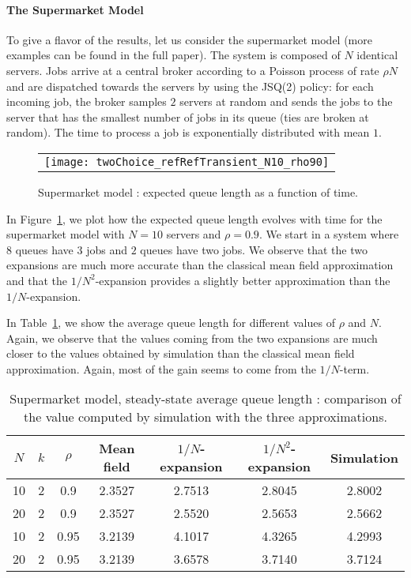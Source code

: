 \documentclass{sig-alternate-per-Performance2018}
\begin{document}
\paragraph*{The Supermarket Model}
To give a flavor of the results, let us consider the supermarket model
(more examples can be found in the full paper).  The system is
composed of $N$ identical servers. Jobs arrive at a central broker
according to a Poisson process of rate $\rho N$ and are dispatched
towards the servers by using the JSQ(2) policy: for each incoming job,
the broker samples $2$ servers at random and sends the jobs to the
server that has the smallest number of jobs in its queue (ties are
broken at random). The time to process a job is exponentially
distributed with mean $1$.

\begin{figure}[ht]
  \centering
  \begin{tabular}{c}
    \texttt{[image: twoChoice\_refRefTransient\_N10\_rho90]}
  \end{tabular}
  \caption{Supermarket model : expected queue length as a function of
    time. }
  \label{fig:supermarket-transient}
\end{figure}

In Figure~\ref{fig:supermarket-transient}, we plot how the expected
queue length evolves with time for the supermarket model with $N=10$
servers and $\rho=0.9$.  We start in a system where $8$ queues have
$3$ jobs and $2$ queues have two jobs.  We observe that the two
expansions are much more accurate than the classical mean field
approximation and that the $1/N^2$-expansion provides a slightly
better approximation than the $1/N$-expansion.


In Table~\ref{tab:supermarket}, we show the average queue length for
different values of $\rho$ and $N$. Again, we observe that the values
coming from the two expansions are much closer to the values obtained
by simulation than the classical mean field approximation. Again, most
of the gain seems to come from the $1/N$-term. 

\begin{table}[ht]
  \centering
  \small 
  \begin{tabular}{@{}|@{ }ccc@{ }|@{}c@{}|@{}c@{}|@{}c@{}|@{}c@{}|@{}}
    \hline
    $N$&$k$&$\rho$&Mean field&$1/N$-expansion&$1/N^2$-expansion&Simulation\\
    \hline 
    10 & 2 & 0.9 	 &2.3527 &	2.7513 &	2.8045 &	2.8002 \\
    20 & 2 & 0.9 	 &2.3527 &	2.5520 &	2.5653 &	2.5662 \\
    \hline
    10 & 2 & 0.95 	 &3.2139 &	4.1017 &	4.3265 &	4.2993 \\
    20 & 2 & 0.95 	 &3.2139 &	3.6578 &	3.7140 &	3.7124 \\
    \hline  \end{tabular}
  \caption{Supermarket model, steady-state average queue length :
    comparison of the value computed by simulation with the three
    approximations. }
  \label{tab:supermarket}
\end{table}
\end{document}
